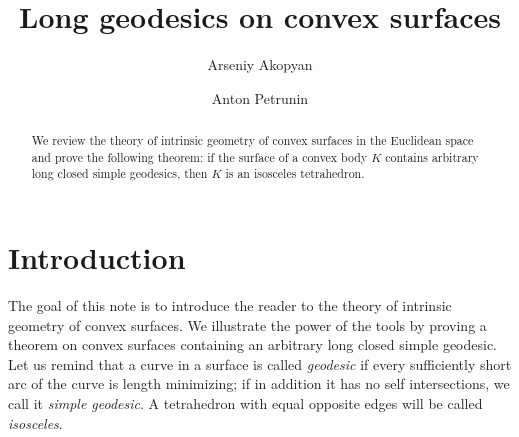 \documentclass[oneside,a4paper, 12pt]{article}
\begin{document}
\title{Long geodesics on convex surfaces}
\author{Arseniy Akopyan
\and 
Anton Petrunin}
\newcommand{\Addresses}{{\bigskip\footnotesize

Arseniy Akopyan, 
\par\nopagebreak\textsc{Institute of Science and Technology Austria
(IST Austria), Am Campus 1, 3400 Klosterneuburg, Austria.}
  \par\nopagebreak
  \textit{Email}: \texttt{akopjan@gmail.com}

\medskip

  Anton Petrunin, \par\nopagebreak\textsc{Math. Dept. PSU, University Park, PA 16802, USA}
  \par\nopagebreak
  \textit{Email}: \texttt{petrunin@math.psu.edu}
}}
\date{}
\maketitle

\begin{abstract}
We review the theory of intrinsic geometry of convex surfaces in the Euclidean space and prove the following theorem: 
if the surface of a convex body $K$ contains arbitrary long closed simple geo\-de\-sics, then $K$ is an isosceles tetrahedron.
\end{abstract}


\section{Introduction}
The goal of this note is to introduce the reader to the theory of intrinsic geometry of convex surfaces.
We illustrate the power of the tools by proving a theorem on convex surfaces containing an arbitrary long closed simple geodesic. 
Let us remind that a curve in a surface is called \emph{geodesic} if every sufficiently short arc of the curve is length minimizing; if in addition it has no self intersections, we call it \emph{simple geodesic}.
A tetrahedron with equal opposite edges will be called \emph{isosceles}.

\end{document}
